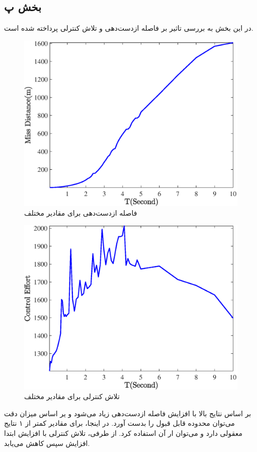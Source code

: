 \subsection{بخش پ}
در این بخش به بررسی تاثیر
بر فاصله‌ ازدست‌دهی و تلاش کنترلی پرداخته شده است.
\begin{figure}[H]
	\centering
	\includegraphics[width=.75\linewidth]{../Figure/Q1/c/MD}
	\caption{فاصله ازدست‌دهی برای مقادیر مختلف }
\end{figure}

\begin{figure}[H]
	\centering
	\includegraphics[width=.75\linewidth]{../Figure/Q1/c/CE}
	\caption{تلاش کنترلی برای مقادیر مختلف }
\end{figure}

بر اساس نتایج بالا با افزایش  فاصله ازدست‌دهی زیاد می‌شود و یر اساس میزان دقت می‌توان محدوده قابل قبول را بدست آورد. در اینجا، برای مقادیر کمتر از ۱ نتایج معقولی دارد و می‌توان ار آن استفاده کرد. از طرفی، تلاش کنترلی با افزایش  ابتدا افزایش سپس کاهش می‌یابد.